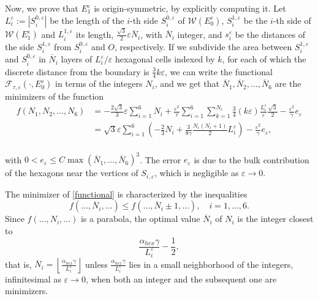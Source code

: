 \documentclass{interact}
\numberwithin{equation}{section}
\theoremstyle{definition}
\renewcommand{\epsilon}{\varepsilon}
\begin{document}
Now, we prove that $E_1^\epsilon$ is origin-symmetric, by explicitly computing it. Let $L_{i}^\epsilon:=|S_{i}^{0,\epsilon}|$ be the length of the $i$-th side $S_{i}^{0,\epsilon}$ of $\mathcal{W}(E^\epsilon_0)$, $S_i^{1,\epsilon}$ be the $i$-th side of $\mathcal{W}(E^\epsilon_1)$ and $L_i^{1,\epsilon}$ its length, $\frac{\sqrt{3}}{2}\epsilon \overline{N}_i$, with $\overline{N}_i$ integer, and $s_i^\epsilon$ be the distances of the side $S_{i}^{1,\epsilon}$ from $S_i^{0,\epsilon}$ and $O$, respectively. If we subdivide the area between $S_{i}^{1,\epsilon}$ and $S_i^{0,\epsilon}$ in $\overline{N}_{i}$ layers of $L_i^\epsilon/\varepsilon$ hexagonal cells indexed by $k$, for each of which the discrete distance from the boundary is $\frac{3}{4}k\epsilon$, we can write the functional $\mathcal{F}_{\tau,\epsilon}(\cdot,E^\epsilon_0)$ in terms of the integers $N_{i}$, and we get that $\overline{N}_{1},\overline{N}_{2},\dots,\overline{N}_{6}$ are the minimizers of the function
\begin{equation}
\begin{split}
f(N_{1},N_{2},\dots,N_{6})&=-\frac{2\sqrt{3}}{3}\epsilon\sum_{i=1}^6 N_{i}+\frac{\epsilon^2}{\tau}\sum_{i=1}^6\sum_{k=1}^{N_{i}}\frac{{3}}{4}(k\epsilon)\frac{L_{i}^\epsilon}{\epsilon}\frac{\sqrt{3}}{2}-\frac{\epsilon^2}{\gamma}e_\epsilon\\
&=\sqrt{3}\epsilon\sum_{i=1}^6\left(-\frac{2}{3}N_{i}+\frac{3}{8\gamma}\frac{N_{i}(N_{i}+1)}{2}L_i^\epsilon\right)-\frac{\epsilon^2}{\gamma}e_\epsilon,
\end{split}
\label{functional}
\end{equation}
\\
with $0<e_\epsilon\leq C\max(\overline{N}_1,\dots,\overline{N}_6)^3$. The error $e_\epsilon$ is due to the bulk contribution of the hexagons near the vertices of $S_{i,\epsilon}$, which is negligible as $\epsilon\to0$.

The minimizer of \eqref{functional} is characterized by the inequalities
\begin{equation*}
f(\dots, \overline{N}_i,\dots)\leq f(\dots, \overline{N}_i\pm1,\dots),\quad i=1,\dots,6.
\end{equation*}
Since $f(\dots, N_i,\dots)$ is a parabola, the optimal value $\overline{N}_i$ of $N_i$ is the integer closest to
\begin{equation*}
\frac{\alpha_{hex}\gamma}{L_i^\epsilon}-\frac{1}{2},
\end{equation*} 
that is, $\overline{N}_i=\left\lfloor\frac{\alpha_{hex}\gamma}{L_i^\epsilon}\right\rfloor$ unless $\frac{\alpha_{hex}\gamma}{L_i^\epsilon}$ lies in a small neighborhood of the integers, infinitesimal as $\epsilon\to0$, when both an integer and the subsequent one are minimizers.
\end{document}
